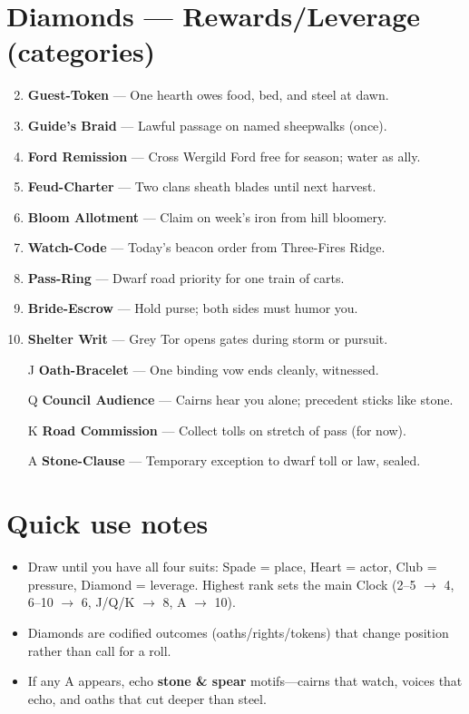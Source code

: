 \section*{Diamonds --- Rewards/Leverage (categories)}
\label{sec:ubral-rewards}
\begin{enumerate}
\setcounter{enumi}{1}
\item \textbf{Guest-Token} --- One hearth owes food, bed, and steel at dawn.
\item \textbf{Guide's Braid} --- Lawful passage on named sheepwalks (once).
\item \textbf{Ford Remission} --- Cross Wergild Ford free for season; water as ally.
\item \textbf{Feud-Charter} --- Two clans sheath blades until next harvest.
\item \textbf{Bloom Allotment} --- Claim on week's iron from hill bloomery.
\item \textbf{Watch-Code} --- Today's beacon order from Three-Fires Ridge.
\item \textbf{Pass-Ring} --- Dwarf road priority for one train of carts.
\item \textbf{Bride-Escrow} --- Hold purse; both sides must humor you.
\item \textbf{Shelter Writ} --- Grey Tor opens gates during storm or pursuit.
\item[J] \textbf{Oath-Bracelet} --- One binding vow ends cleanly, witnessed.
\item[Q] \textbf{Council Audience} --- Cairns hear you alone; precedent sticks like stone.
\item[K] \textbf{Road Commission} --- Collect tolls on stretch of pass (for now).
\item[A] \textbf{Stone-Clause} --- Temporary exception to dwarf toll or law, sealed.
\end{enumerate}

\section*{Quick use notes}
\label{sec:ubral-quick-use}
\begin{itemize}
\item Draw until you have all four suits: Spade = place, Heart = actor, Club = pressure, Diamond = leverage. Highest rank sets the main Clock (2--5 $\rightarrow$ 4, 6--10 $\rightarrow$ 6, J/Q/K $\rightarrow$ 8, A $\rightarrow$ 10).
\item Diamonds are codified outcomes (oaths/rights/tokens) that change position rather than call for a roll.
\item If any A appears, echo \textbf{stone \& spear} motifs---cairns that watch, voices that echo, and oaths that cut deeper than steel.
\end{itemize}

